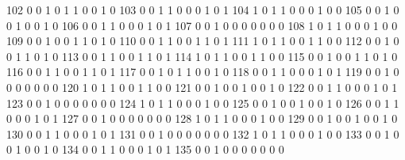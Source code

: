 \documentclass[compress,8pt]{beamer}
\begin{document}
\begin{frame}
\begin{Schunk}
  102      0       0   1              0        1    1       0       0   1   0
  103      0       0   1              1        0    0       0       1   0   1
  104      1       0   1              1        0    0       0       1   0   0
  105      0       0   1              0        0    1       0       0   1   0
  106      0       0   1              1        0    0       0       1   0   1
  107      0       0   1              0        0    0       0       0   0   0
  108      1       0   1              1        0    0       0       1   0   0
  109      0       0   1              0        0    1       1       0   1   0
  110      0       0   1              1        0    0       1       1   0   1
  111      1       0   1              1        0    0       1       1   0   0
  112      0       0   1              0        0    1       1       0   1   0
  113      0       0   1              1        0    0       1       1   0   1
  114      1       0   1              1        0    0       1       1   0   0
  115      0       0   1              0        0    1       1       0   1   0
  116      0       0   1              1        0    0       1       1   0   1
  117      0       0   1              0        1    1       0       0   1   0
  118      0       0   1              1        0    0       0       1   0   1
  119      0       0   1              0        0    0       0       0   0   0
  120      1       0   1              1        0    0       1       1   0   0
  121      0       0   1              0        0    1       0       0   1   0
  122      0       0   1              1        0    0       0       1   0   1
  123      0       0   1              0        0    0       0       0   0   0
  124      1       0   1              1        0    0       0       1   0   0
  125      0       0   1              0        0    1       0       0   1   0
  126      0       0   1              1        0    0       0       1   0   1
  127      0       0   1              0        0    0       0       0   0   0
  128      1       0   1              1        0    0       0       1   0   0
  129      0       0   1              0        0    1       0       0   1   0
  130      0       0   1              1        0    0       0       1   0   1
  131      0       0   1              0        0    0       0       0   0   0
  132      1       0   1              1        0    0       0       1   0   0
  133      0       0   1              0        0    1       0       0   1   0
  134      0       0   1              1        0    0       0       1   0   1
  135      0       0   1              0        0    0       0       0   0   0

\end{Schunk}
\end{frame}
\end{document}
